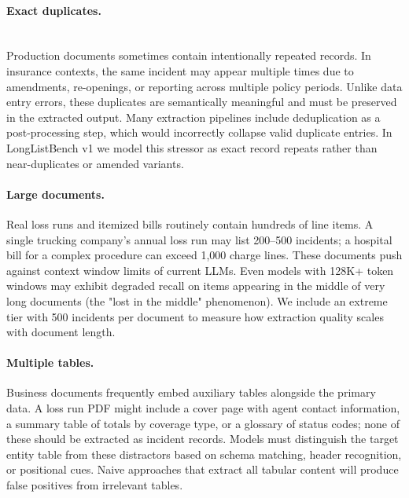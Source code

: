 \paragraph{Exact duplicates.}
\mbox{}\\
Production documents sometimes contain intentionally repeated records. In insurance contexts, the same incident may appear multiple times due to amendments, re-openings, or reporting across multiple policy periods. Unlike data entry errors, these duplicates are semantically meaningful and must be preserved in the extracted output. Many extraction pipelines include deduplication as a post-processing step, which would incorrectly collapse valid duplicate entries. In LongListBench v1 we model this stressor as exact record repeats rather than near-duplicates or amended variants.

\paragraph{Large documents.}
Real loss runs and itemized bills routinely contain hundreds of line items. A single trucking company's annual loss run may list 200--500 incidents; a hospital bill for a complex procedure can exceed 1{,}000 charge lines. These documents push against context window limits of current LLMs. Even models with 128K+ token windows may exhibit degraded recall on items appearing in the middle of very long documents (the "lost in the middle" phenomenon). We include an extreme tier with 500 incidents per document to measure how extraction quality scales with document length.

\paragraph{Multiple tables.}
Business documents frequently embed auxiliary tables alongside the primary data. A loss run PDF might include a cover page with agent contact information, a summary table of totals by coverage type, or a glossary of status codes; none of these should be extracted as incident records. Models must distinguish the target entity table from these distractors based on schema matching, header recognition, or positional cues. Naive approaches that extract all tabular content will produce false positives from irrelevant tables.


